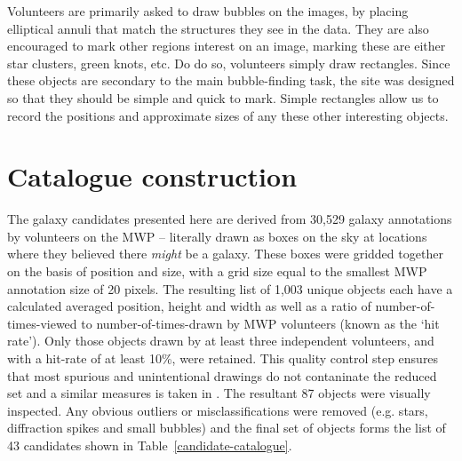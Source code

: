 \documentclass[times,usenatbib]{mn2e}
\begin{document}
Volunteers are primarily asked to draw bubbles on the images, by placing elliptical annuli that match the structures they see in the data. They are also encouraged to mark other regions interest on an image, marking these are either star clusters, green knots, etc. Do do so, volunteers simply draw rectangles. Since these objects are secondary to the main bubble-finding task, the site was designed so that they should be simple and quick to mark. Simple rectangles allow us to record the positions and approximate sizes of any these other interesting objects.

\section{Catalogue construction}

The galaxy candidates presented here are derived from 30,529 galaxy annotations by volunteers on the MWP -- literally drawn as boxes on the sky at locations where they believed there \emph{might} be a galaxy. These boxes were gridded together on the basis of position and size, with a grid size equal to the smallest MWP annotation size of 20 pixels. The resulting list of 1,003 unique objects each have a calculated averaged position, height and width as well as a ratio of number-of-times-viewed to number-of-times-drawn by MWP volunteers (known as the `hit rate'). Only those objects drawn by at least three independent volunteers, and with a hit-rate of at least 10\%, were retained. This quality control step ensures that most spurious and unintentional drawings do not contaninate the reduced set and a similar measures is taken in \citet{Simpson+12}. The resultant 87 objects were visually inspected. Any obvious outliers or misclassifications were removed (e.g. stars, diffraction spikes and small bubbles) and the final set of objects forms the list of 43 candidates shown in Table~\ref{candidate-catalogue}.
\end{document}

